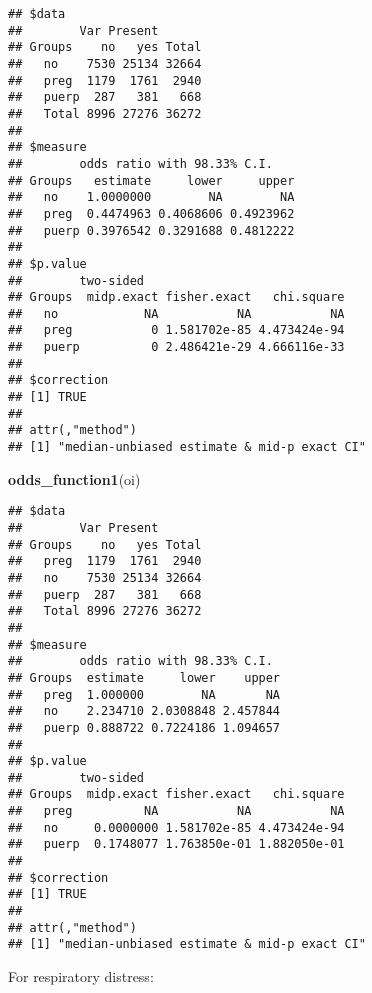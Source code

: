 \documentclass[
]{article}
\newenvironment{Shaded}{\begin{snugshade}}{\end{snugshade}}
\newcommand{\DataTypeTok}[1]{\textcolor[rgb]{0.13,0.29,0.53}{#1}}
\newcommand{\KeywordTok}[1]{\textcolor[rgb]{0.13,0.29,0.53}{\textbf{#1}}}
\newcommand{\NormalTok}[1]{#1}
\newcommand{\OperatorTok}[1]{\textcolor[rgb]{0.81,0.36,0.00}{\textbf{#1}}}
\newcommand{\OtherTok}[1]{\textcolor[rgb]{0.56,0.35,0.01}{#1}}
\newcommand{\StringTok}[1]{\textcolor[rgb]{0.31,0.60,0.02}{#1}}
\begin{document}
\begin{verbatim}
## $data
##        Var Present
## Groups    no   yes Total
##   no    7530 25134 32664
##   preg  1179  1761  2940
##   puerp  287   381   668
##   Total 8996 27276 36272
## 
## $measure
##        odds ratio with 98.33% C.I.
## Groups   estimate     lower     upper
##   no    1.0000000        NA        NA
##   preg  0.4474963 0.4068606 0.4923962
##   puerp 0.3976542 0.3291688 0.4812222
## 
## $p.value
##        two-sided
## Groups  midp.exact fisher.exact   chi.square
##   no            NA           NA           NA
##   preg           0 1.581702e-85 4.473424e-94
##   puerp          0 2.486421e-29 4.666116e-33
## 
## $correction
## [1] TRUE
## 
## attr(,"method")
## [1] "median-unbiased estimate & mid-p exact CI"
\end{verbatim}

\begin{Shaded}
\begin{Highlighting}[]
\KeywordTok{odds_function1}\NormalTok{(oi)}
\end{Highlighting}
\end{Shaded}

\begin{verbatim}
## $data
##        Var Present
## Groups    no   yes Total
##   preg  1179  1761  2940
##   no    7530 25134 32664
##   puerp  287   381   668
##   Total 8996 27276 36272
## 
## $measure
##        odds ratio with 98.33% C.I.
## Groups  estimate     lower    upper
##   preg  1.000000        NA       NA
##   no    2.234710 2.0308848 2.457844
##   puerp 0.888722 0.7224186 1.094657
## 
## $p.value
##        two-sided
## Groups  midp.exact fisher.exact   chi.square
##   preg          NA           NA           NA
##   no     0.0000000 1.581702e-85 4.473424e-94
##   puerp  0.1748077 1.763850e-01 1.882050e-01
## 
## $correction
## [1] TRUE
## 
## attr(,"method")
## [1] "median-unbiased estimate & mid-p exact CI"
\end{verbatim}

For respiratory distress:

\begin{Shaded}
\end{Shaded}
\end{document}

